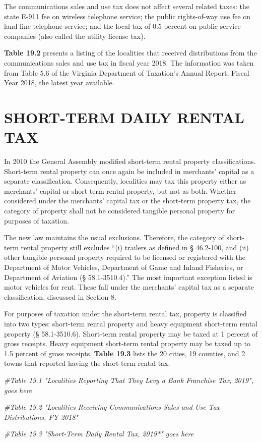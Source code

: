 \documentclass[
]{book}
\newenvironment{Shaded}{\begin{snugshade}}{\end{snugshade}}
\newcommand{\CommentTok}[1]{\textcolor[rgb]{0.56,0.35,0.01}{\textit{#1}}}
\begin{document}
The communications sales and use tax does not affect several related taxes: the state E-911 fee on wireless telephone service; the public rights-of-way use fee on land line telephone service; and the local tax of 0.5 percent on public service companies (also called the utility license tax).

\textbf{Table 19.2} presents a listing of the localities that received distributions from the communications sales and use tax in fiscal year 2018. The information was taken from Table 5.6 of the Virginia Department of Taxation's Annual Report, Fiscal Year 2018, the latest year available.

\hypertarget{short-term-daily-rental-tax}{%
\section{SHORT-TERM DAILY RENTAL TAX}\label{short-term-daily-rental-tax}}

In 2010 the General Assembly modified short-term rental property classifications. Short-term rental property can once again be included in merchants' capital as a separate classification. Consequently, localities may tax this property either as merchants' capital or short-term rental property, but not as both. Whether considered under the merchants' capital tax or the short-term property tax, the category of property shall not be considered tangible personal property for purposes of taxation.

The new law maintains the usual exclusions. Therefore, the category of short-term rental property still excludes ``(i) trailers as defined in § 46.2-100, and (ii) other tangible personal property required to be licensed or registered with the Department of Motor Vehicles, Department of Game and Inland Fisheries, or Department of Aviation (§ 58.1-3510.4).'' The most important exception listed is motor vehicles for rent. These fall under the merchants' capital tax as a separate classification, discussed in Section 8.

For purposes of taxation under the short-term rental tax, property is classified into two types: short-term rental property and heavy equipment short-term rental property (§ 58.1-3510.6). Short-term rental property may be taxed at 1 percent of gross receipts. Heavy equipment short-term rental property may be taxed up to 1.5 percent of gross receipts. \textbf{Table 19.3} lists the 20 cities, 19 counties, and 2 towns that reported having the short-term rental tax.

\begin{Shaded}
\begin{Highlighting}[]
\CommentTok{\#Table 19.1 "Localities Reporting That They Levy a Bank Franchise Tax, 2019", goes here}

\CommentTok{\#Table 19.2 "Localities Receiving Communications Sales and Use Tax Distributions, FY 2018"}

\CommentTok{\#Table 19.3 "Short{-}Term Daily Rental Tax, 2019*" goes here}
\end{Highlighting}
\end{Shaded}
\end{document}
